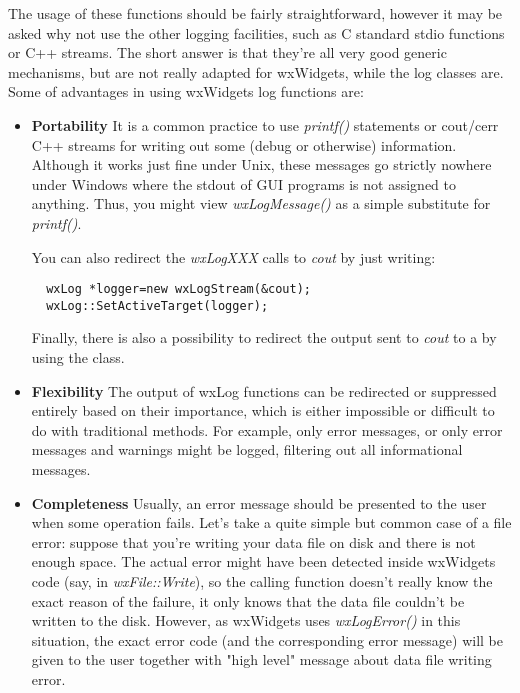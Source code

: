 The usage of these functions should be fairly straightforward, however it may
be asked why not use the other logging facilities, such as C standard stdio
functions or C++ streams. The short answer is that they're all very good
generic mechanisms, but are not really adapted for wxWidgets, while the log
classes are. Some of advantages in using wxWidgets log functions are:

\begin{itemize}\itemsep=0pt
\item{\bf Portability} It is a common practice to use {\it printf()}
statements or cout/cerr C++ streams for writing out some (debug or otherwise)
information.
Although it works just fine under Unix, these messages go strictly nowhere
under Windows where the stdout of GUI programs is not assigned to anything.
Thus, you might view {\it wxLogMessage()} as a simple substitute for {\it
printf()}.

You can also redirect the {\it wxLogXXX} calls to {\it cout} by just writing:
{\small
\begin{verbatim}
  wxLog *logger=new wxLogStream(&cout);
  wxLog::SetActiveTarget(logger);
\end{verbatim}
}

Finally, there is also a possibility to redirect the output sent to {\it cout} 
to a  by using the 
 class.
\item{\bf Flexibility} The output of wxLog functions can be redirected or
suppressed entirely based on their importance, which is either impossible or
difficult to do with traditional methods. For example, only error messages, or
only error messages and warnings might be logged, filtering out all
informational messages.
\item{\bf Completeness} Usually, an error message should be presented to the user
when some operation fails. Let's take a quite simple but common case of a file
error: suppose that you're writing your data file on disk and there is not
enough space. The actual error might have been detected inside wxWidgets code
(say, in {\it wxFile::Write}), so the calling function doesn't really know the
exact reason of the failure, it only knows that the data file couldn't be
written to the disk. However, as wxWidgets uses {\it wxLogError()} in this
situation, the exact error code (and the corresponding error message) will be
given to the user together with "high level" message about data file writing
error.
\end{itemize}

